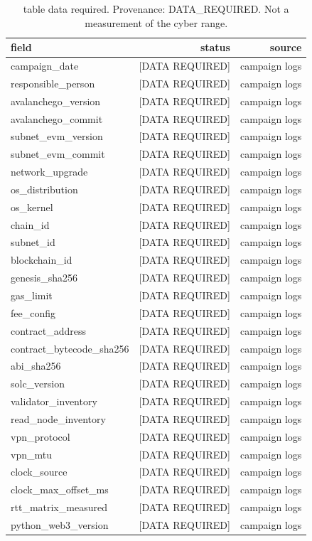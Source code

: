 \begin{table}[t]
\caption{table data required. Provenance: DATA\_REQUIRED.  Not a measurement of the cyber range.}
\label{tab:table_data_required}
\centering
\begin{tabular}{lrr}
\hline
field & status & source \\
\hline
campaign\_date & [DATA REQUIRED] & campaign logs \\
responsible\_person & [DATA REQUIRED] & campaign logs \\
avalanchego\_version & [DATA REQUIRED] & campaign logs \\
avalanchego\_commit & [DATA REQUIRED] & campaign logs \\
subnet\_evm\_version & [DATA REQUIRED] & campaign logs \\
subnet\_evm\_commit & [DATA REQUIRED] & campaign logs \\
network\_upgrade & [DATA REQUIRED] & campaign logs \\
os\_distribution & [DATA REQUIRED] & campaign logs \\
os\_kernel & [DATA REQUIRED] & campaign logs \\
chain\_id & [DATA REQUIRED] & campaign logs \\
subnet\_id & [DATA REQUIRED] & campaign logs \\
blockchain\_id & [DATA REQUIRED] & campaign logs \\
genesis\_sha256 & [DATA REQUIRED] & campaign logs \\
gas\_limit & [DATA REQUIRED] & campaign logs \\
fee\_config & [DATA REQUIRED] & campaign logs \\
contract\_address & [DATA REQUIRED] & campaign logs \\
contract\_bytecode\_sha256 & [DATA REQUIRED] & campaign logs \\
abi\_sha256 & [DATA REQUIRED] & campaign logs \\
solc\_version & [DATA REQUIRED] & campaign logs \\
validator\_inventory & [DATA REQUIRED] & campaign logs \\
read\_node\_inventory & [DATA REQUIRED] & campaign logs \\
vpn\_protocol & [DATA REQUIRED] & campaign logs \\
vpn\_mtu & [DATA REQUIRED] & campaign logs \\
clock\_source & [DATA REQUIRED] & campaign logs \\
clock\_max\_offset\_ms & [DATA REQUIRED] & campaign logs \\
rtt\_matrix\_measured & [DATA REQUIRED] & campaign logs \\
python\_web3\_version & [DATA REQUIRED] & campaign logs \\
\hline
\end{tabular}
\end{table}
